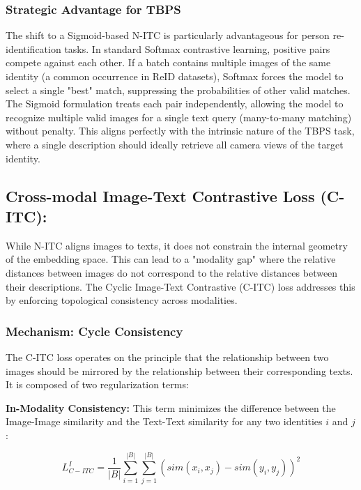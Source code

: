 \documentclass[../main.tex]{subfiles}
\begin{document}
\subsubsection{Strategic Advantage for TBPS}

The shift to a Sigmoid-based N-ITC is particularly advantageous for person re-identification tasks. In standard Softmax contrastive learning, positive pairs compete against each other. If a batch contains multiple images of the same identity (a common occurrence in ReID datasets), Softmax forces the model to select a single "best" match, suppressing the probabilities of other valid matches. The Sigmoid formulation treats each pair independently, allowing the model to recognize multiple valid images for a single text query (many-to-many matching) without penalty. This aligns perfectly with the intrinsic nature of the TBPS task, where a single description should ideally retrieve all camera views of the target identity.

\subsection{Cross-modal Image-Text Contrastive Loss (C-ITC):}

While N-ITC aligns images to texts, it does not constrain the internal geometry of the embedding space. This can lead to a "modality gap" where the relative distances between images do not correspond to the relative distances between their descriptions. The Cyclic Image-Text Contrastive (C-ITC) loss addresses this by enforcing topological consistency across modalities.

\subsubsection{Mechanism: Cycle Consistency}

The C-ITC loss operates on the principle that the relationship between two images should be mirrored by the relationship between their corresponding texts. It is composed of two regularization terms:

\noindent \textbf{In-Modality Consistency:} This term minimizes the difference between the Image-Image similarity and the Text-Text similarity for any two identities $i$ and $j$:

\begin{equation}
    L_{C-ITC}^I = \frac{1}{|B|} \sum_{i=1}^{|B|} \sum_{j=1}^{|B|} \left( sim(x_i, x_j) - sim(y_i, y_j) \right)^2
\end{equation}
\end{document}
